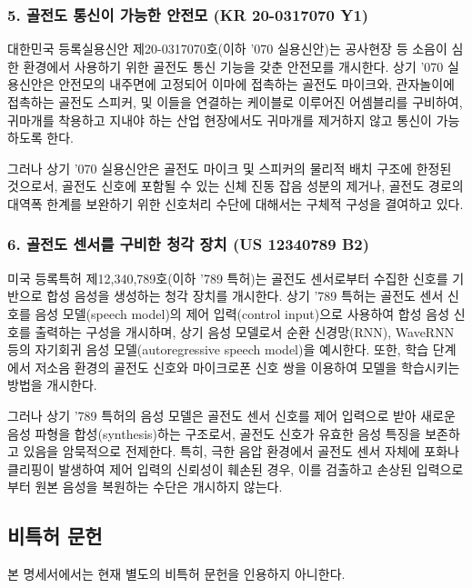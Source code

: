 \documentclass{article}
\begin{document}
\subsubsection*{5. 골전도 통신이 가능한 안전모 (KR 20-0317070 Y1)}

대한민국 등록실용신안 제20-0317070호(이하 '070 실용신안)는 공사현장 등 소음이 심한 환경에서 사용하기 위한 골전도 통신 기능을 갖춘 안전모를 개시한다.
상기 '070 실용신안은 안전모의 내주면에 고정되어 이마에 접촉하는 골전도 마이크와, 관자놀이에 접촉하는 골전도 스피커, 및 이들을 연결하는 케이블로 이루어진 어셈블리를 구비하여, 귀마개를 착용하고 지내야 하는 산업 현장에서도 귀마개를 제거하지 않고 통신이 가능하도록 한다.

그러나 상기 '070 실용신안은 골전도 마이크 및 스피커의 물리적 배치 구조에 한정된 것으로서, 골전도 신호에 포함될 수 있는 신체 진동 잡음 성분의 제거나, 골전도 경로의 대역폭 한계를 보완하기 위한 신호처리 수단에 대해서는 구체적 구성을 결여하고 있다.


\subsubsection*{6. 골전도 센서를 구비한 청각 장치 (US 12340789 B2)}

미국 등록특허 제12,340,789호(이하 '789 특허)는 골전도 센서로부터 수집한 신호를 기반으로 합성 음성을 생성하는 청각 장치를 개시한다.
상기 '789 특허는 골전도 센서 신호를 음성 모델(speech model)의 제어 입력(control input)으로 사용하여 합성 음성 신호를 출력하는 구성을 개시하며, 상기 음성 모델로서 순환 신경망(RNN), WaveRNN 등의 자기회귀 음성 모델(autoregressive speech model)을 예시한다.
또한, 학습 단계에서 저소음 환경의 골전도 신호와 마이크로폰 신호 쌍을 이용하여 모델을 학습시키는 방법을 개시한다.

그러나 상기 '789 특허의 음성 모델은 골전도 센서 신호를 제어 입력으로 받아 새로운 음성 파형을 합성(synthesis)하는 구조로서, 골전도 신호가 유효한 음성 특징을 보존하고 있음을 암묵적으로 전제한다. 
특히, 극한 음압 환경에서 골전도 센서 자체에 포화나 클리핑이 발생하여 제어 입력의 신뢰성이 훼손된 경우, 이를 검출하고 손상된 입력으로부터 원본 음성을 복원하는 수단은 개시하지 않는다.



\subsection{비특허 문헌}

본 명세서에서는 현재 별도의 비특허 문헌을 인용하지 아니한다.
\end{document}
